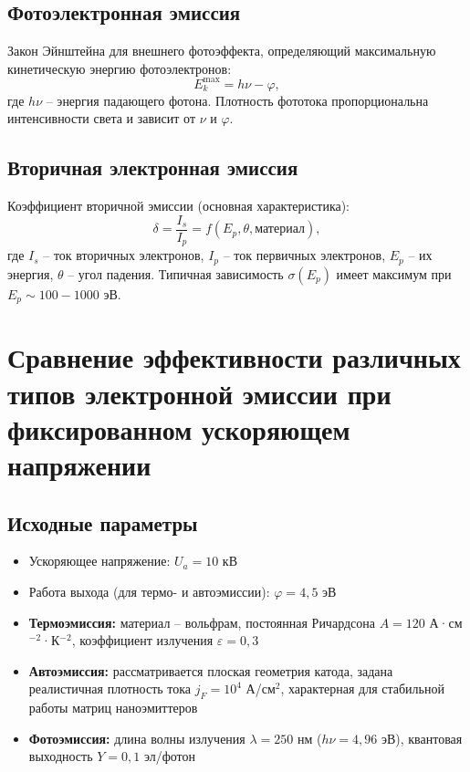 \documentclass[12pt]{article}
\begin{document}
\subsection*{Фотоэлектронная эмиссия}
Закон Эйнштейна для внешнего фотоэффекта, определяющий максимальную кинетическую энергию фотоэлектронов:
\begin{equation}
    E_k^{\text{max}} = h\nu - \varphi,
    \label{eq:photo_emission}
\end{equation}
где $h\nu$ -- энергия падающего фотона. Плотность фототока пропорциональна интенсивности света и зависит от $\nu$ и $\varphi$.

\subsection*{Вторичная электронная эмиссия}
Коэффициент вторичной эмиссии (основная характеристика):
\begin{equation}
    \delta = \frac{I_s}{I_p} = f(E_p, \theta, \text{материал}),
    \label{eq:secondary_emission}
\end{equation}
где $I_s$ -- ток вторичных электронов, $I_p$ -- ток первичных электронов, $E_p$ -- их энергия, $\theta$ -- угол падения. 
Типичная зависимость $\sigma(E_p)$ имеет максимум при $E_p \sim 100\!-\!1000$ эВ.




\section*{Сравнение эффективности различных типов электронной эмиссии при фиксированном ускоряющем напряжении}

\subsection*{Исходные параметры}
\begin{itemize}
    \item Ускоряющее напряжение: $U_a = 10$ кВ
    \item Работа выхода (для термо- и автоэмиссии): $\varphi = 4,5$ эВ
    \item \textbf{Термоэмиссия:} материал -- вольфрам, постоянная Ричардсона $A = 120$ А·см$^{-2}$·К$^{-2}$, коэффициент излучения $\varepsilon = 0,3$
    \item \textbf{Автоэмиссия:} рассматривается плоская геометрия катода, задана реалистичная плотность тока $j_F = 10^4$ А/см$^2$, характерная для стабильной работы матриц наноэмиттеров
    \item \textbf{Фотоэмиссия:} длина волны излучения $\lambda = 250$ нм ($h\nu = 4,96$ эВ), квантовая выходность $Y = 0,1$ эл/фотон
\end{itemize}
\end{document}
